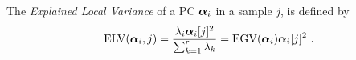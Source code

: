 \begin{definition}


The {\em Explained Local Variance} of a PC $\boldsymbol{\alpha}_i$ in a sample $j$, is defined by
\begin{equation}
\mathrm{ELV}(\boldsymbol{\alpha}_i,j) = \frac{\lambda_i \boldsymbol{\alpha}_i[j]^2}{\sum_{k=1}^r\lambda_k} = \mathrm{EGV}(\boldsymbol{\alpha}_i) \boldsymbol{\alpha}_i[j]^2  \mbox{ .}
\end{equation}
\end{definition}
